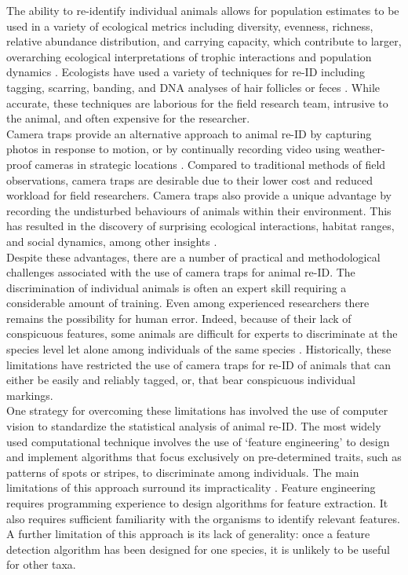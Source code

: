 \documentclass[11pt]{article}
\begin{document}
The ability to re-identify individual animals allows for population estimates to be used in a variety of ecological metrics including diversity, evenness, richness, relative abundance distribution, and carrying capacity, which contribute to larger, overarching ecological interpretations of trophic interactions and population dynamics \cite{whittaker1972evolution, hawley1982ecology, krebs1989ecological}. Ecologists have used a variety of techniques for re-ID including tagging, scarring, banding, and DNA analyses of hair follicles or feces \cite{krebs1989ecological, mowat2000estimating}. While accurate, these techniques are laborious for the field research team, intrusive to the animal, and often expensive for the researcher.
\newline
\\
Camera traps provide an alternative approach to animal re-ID by capturing photos in response to motion, or by continually recording video using weather-proof cameras in strategic locations \cite{o2010camera}. Compared to traditional methods of field observations, camera traps are desirable due to their lower cost and reduced workload for field researchers. Camera traps also provide a unique advantage by recording the undisturbed behaviours of animals within their environment. This has resulted in the discovery of surprising ecological interactions, habitat ranges, and social dynamics, among other insights \cite{stojanovic2014discovery, sangay2014wildife, scheel2017second, meek2013reliability}. 
\newline
\\
Despite these advantages, there are a number of practical and methodological challenges associated with the use of camera traps for animal re-ID. The discrimination of individual animals is often an expert skill requiring a considerable amount of training. Even among experienced researchers there remains the possibility for human error. Indeed, because of their lack of conspicuous features, some animals are difficult for experts to discriminate at the species level let alone among individuals of the same species \cite{meek2013reliability}. Historically, these limitations have restricted the use of camera traps for re-ID of animals that can either be easily and reliably tagged, or, that bear conspicuous individual markings. 
\newline
\\
One strategy for overcoming these limitations has involved the use of computer vision to standardize the statistical analysis of animal re-ID. The most widely used computational technique involves the use of `feature engineering' to design and implement algorithms that focus exclusively on pre-determined traits, such as patterns of spots or stripes, to discriminate among individuals. The main limitations of this approach surround its impracticality \cite{hiby2009tiger}. Feature engineering requires programming experience to design algorithms for feature extraction. It also requires sufficient familiarity with the organisms to identify relevant features. A further limitation of this approach is its lack of generality: once a feature detection algorithm has been designed for one species, it is unlikely to be useful for other taxa.  
\end{document}
